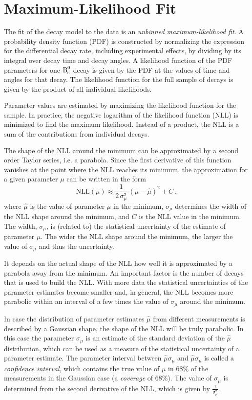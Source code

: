\section{Maximum-Likelihood Fit}
\label{sec:ana_fit}

The fit of the decay model to the data is an \emph{unbinned maximum-likelihood fit}. A probability density function (PDF) is constructed by
normalizing the expression for the differential decay rate, including experimental effects, by dividing by its integral over decay time and
decay angles. A likelihood function of the PDF parameters for one $\text{B}_\text{s}^\text{0}$ decay is given by the PDF at the values of time and angles for
that decay. The likelihood function for the full sample of decays is given by the product of all individual likelihoods.

Parameter values are estimated by maximizing the likelihood function for the sample. In practice, the negative logarithm of the likelihood
function (NLL) is minimized to find the maximum likelihood. Instead of a product, the NLL is a sum of the contributions from individual
decays.

The shape of the NLL around the minimum can be approximated by a second order Taylor series, i.e. a parabola. Since the first derivative of
this function vanishes at the point where the NLL reaches its minimum, the approximation for a given parameter $\mu$ can be written in the
form
\begin{equation}
  \label{eq:NLLPara}
  \text{NLL}(\mu) \approx \frac{1}{2\,\sigma_\mu^2}\, (\mu-\hat{\mu})^2 + C \ ,
\end{equation}
where $\hat{\mu}$ is the value of parameter $\mu$ in the minimum, $\sigma_\mu$ determines the width of the NLL shape around the minimum,
and $C$ is the NLL value in the minimum. The width, $\sigma_\mu$, is (related to) the statistical uncertainty of the estimate of parameter
$\mu$. The wider the NLL shape around the minimum, the larger the value of $\sigma_\mu$ and thus the uncertainty.

It depends on the actual shape of the NLL how well it is approximated by a parabola away from the minimum. An important factor is the
number of decays that is used to build the NLL. With more data the statistical uncertainties of the parameter estimates become smaller and,
in general, the NLL becomes more parabolic within an interval of a few times the value of $\sigma_\mu$ around the minimum.

In case the distribution of parameter estimates $\hat{\mu}$ from different measurements is described by a Gaussian shape, the shape of the
NLL will be truly parabolic. In this case the parameter $\sigma_\mu$ is an estimate of the standard deviation of the $\hat{\mu}$
distribution, which can be used as a measure of the statistical uncertainty of a parameter estimate. The parameter interval between
$\hat{\mu}$\textminus$\sigma_\mu$ and $\hat{\mu}$\textplus$\sigma_\mu$ is called a \emph{confidence interval}, which contains the true
value of $\mu$ in 68\% of the measurements in the Gaussian case (a \emph{coverage} of 68\%). The value of $\sigma_\mu$ is determined from
the second derivative of the NLL, which is given by $\frac{1}{\sigma_\mu^2}$.


